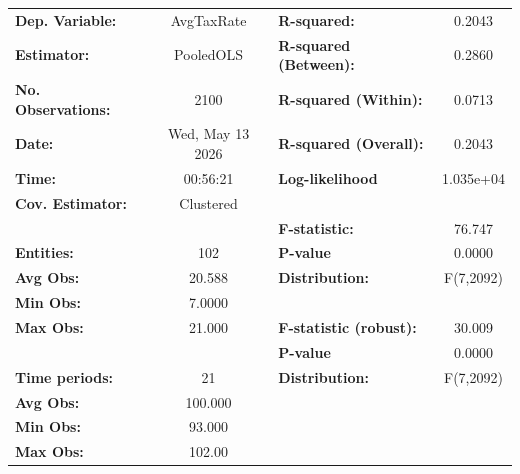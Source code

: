 \begin{center}
\begin{tabular}{lclc}
\toprule
\textbf{Dep. Variable:}                       &     AvgTaxRate     & \textbf{  R-squared:         }   &      0.2043      \\
\textbf{Estimator:}                           &     PooledOLS      & \textbf{  R-squared (Between):}  &      0.2860      \\
\textbf{No. Observations:}                    &        2100        & \textbf{  R-squared (Within):}   &      0.0713      \\
\textbf{Date:}                                &  Wed, May 13 2026  & \textbf{  R-squared (Overall):}  &      0.2043      \\
\textbf{Time:}                                &      00:56:21      & \textbf{  Log-likelihood     }   &    1.035e+04     \\
\textbf{Cov. Estimator:}                      &     Clustered      & \textbf{                     }   &                  \\
\textbf{}                                     &                    & \textbf{  F-statistic:       }   &      76.747      \\
\textbf{Entities:}                            &        102         & \textbf{  P-value            }   &      0.0000      \\
\textbf{Avg Obs:}                             &       20.588       & \textbf{  Distribution:      }   &    F(7,2092)     \\
\textbf{Min Obs:}                             &       7.0000       & \textbf{                     }   &                  \\
\textbf{Max Obs:}                             &       21.000       & \textbf{  F-statistic (robust):} &      30.009      \\
\textbf{}                                     &                    & \textbf{  P-value            }   &      0.0000      \\
\textbf{Time periods:}                        &         21         & \textbf{  Distribution:      }   &    F(7,2092)     \\
\textbf{Avg Obs:}                             &      100.000       & \textbf{                     }   &                  \\
\textbf{Min Obs:}                             &       93.000       & \textbf{                     }   &                  \\
\textbf{Max Obs:}                             &       102.00       & \textbf{                     }   &                  \\

\end{tabular}
\end{center}
